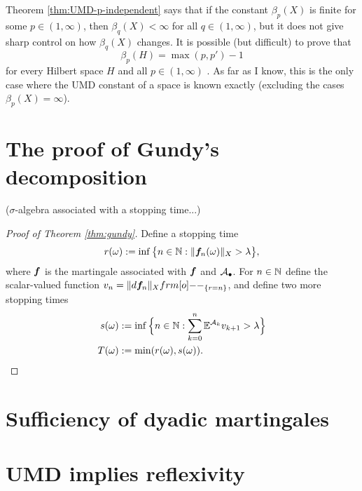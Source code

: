 \begin{rmk}
  Theorem \ref{thm:UMD-p-independent} says that if the constant $\beta_{p}(X)$ is finite for some $p \in (1,\infty)$, then $\beta_{q}(X) < \infty$ for all $q \in (1,\infty)$, but it does not give sharp control on how $\beta_{q}(X)$ changes.
  It is possible (but difficult) to prove that
  \begin{equation*}
    \beta_{p}(H) = \max(p,p') - 1
  \end{equation*}
  for every Hilbert space $H$ and all $p \in (1,\infty)$ \cite[Corollary 4.5.15]{HNVW16}.
  As far as I know, this is the only case where the UMD constant of a space is known exactly (excluding the cases $\beta_{p}(X) = \infty$).
\end{rmk}


\section{The proof of Gundy's decomposition}

 ($\sigma$-algebra associated with a stopping time...)

\begin{proof}[Proof of Theorem \ref{thm:gundy}]
  Define a stopping time
  \begin{equation*}
    r(\omega) := \inf\big\{ n \in \mathbb{N} : \|\bm{f}_{n}(\omega)\|_{X} > \lambda \big\},
  \end{equation*}
  where $\bm{f}$ is the martingale associated with $\bm{f}$ and $\mathcal{A}_{\bullet}$.
  For $n \in \mathbb{N}$ define the scalar-valued function $v_{n} = \|d\mb{f}_{n}\|_{X} \1_{\{r = n\}}$, and define two more stopping times
  \begin{equation*}
    \begin{aligned}
      s(\omega) &:= \inf\Big\{ n \in \mathbb{N} : \sum_{k=0}^{n} \mathbb{E}^{\mathcal{A}_{k}} v_{k+1} > \lambda \Big\} \\
      T(\omega) &:= \min(r(\omega), s(\omega)).
    \end{aligned}
  \end{equation*}
  
\end{proof}

\section{Sufficiency of dyadic martingales}

\section{UMD implies reflexivity}

